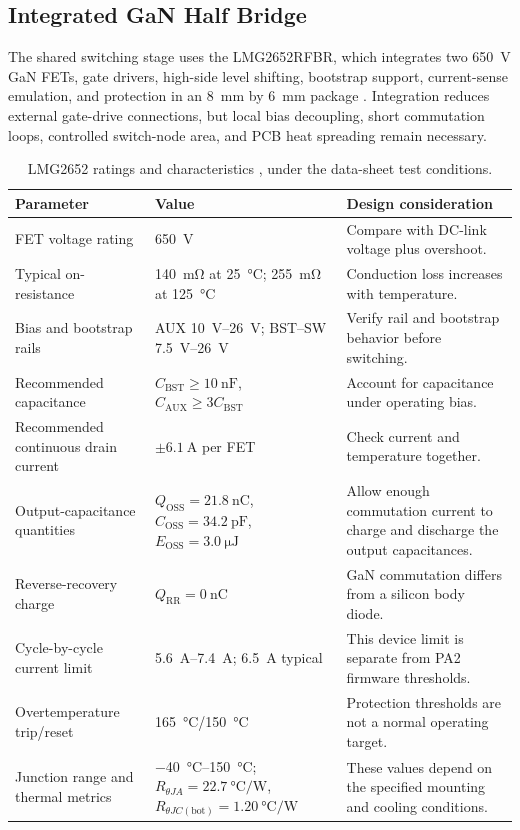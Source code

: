 \subsection{Integrated GaN Half Bridge}
\label{sec:hw-halfbridge}

The shared switching stage uses the LMG2652RFBR, which integrates two \SI{650}{\volt} GaN FETs, gate drivers, high-side level shifting, bootstrap support, current-sense emulation, and protection in an \SI{8}{\milli\metre} by \SI{6}{\milli\metre} package \cite{tiLMG2652}. Integration reduces external gate-drive connections, but local bias decoupling, short commutation loops, controlled switch-node area, and PCB heat spreading remain necessary.

\begin{table}[htbp]
\centering
\caption{LMG2652 ratings and characteristics \cite{tiLMG2652}, under the data-sheet test conditions.}
\label{tab:lmg2652-ratings}
\small
\begin{tabularx}{\textwidth}{@{}p{}p{}X@{}}
\toprule
Parameter & Value & Design consideration\\
\midrule
FET voltage rating & \SI{650}{\volt} & Compare with DC-link voltage plus overshoot.\\
Typical on-resistance & \SI{140}{\milli\ohm} at \SI{25}{\celsius}; \SI{255}{\milli\ohm} at \SI{125}{\celsius} & Conduction loss increases with temperature.\\
Bias and bootstrap rails & AUX \SIrange{10}{26}{\volt}; BST--SW \SIrange{7.5}{26}{\volt} & Verify rail and bootstrap behavior before switching.\\
Recommended capacitance & \(C_{\mathrm{BST}}\geq\SI{10}{\nano\farad}\), \(C_{\mathrm{AUX}}\geq3C_{\mathrm{BST}}\) & Account for capacitance under operating bias.\\
Recommended continuous drain current & \(\pm\SI{6.1}{\ampere}\) per FET & Check current and temperature together.\\
Output-capacitance quantities & \(Q_{\mathrm{OSS}}=\SI{21.8}{\nano\coulomb}\), \(C_{\mathrm{OSS}}=\SI{34.2}{\pico\farad}\), \(E_{\mathrm{OSS}}=\SI{3.0}{\micro\joule}\) & Allow enough commutation current to charge and discharge the output capacitances.\\
Reverse-recovery charge & \(Q_{\mathrm{RR}}=\SI{0}{\nano\coulomb}\) & GaN commutation differs from a silicon body diode.\\
Cycle-by-cycle current limit & \SIrange{5.6}{7.4}{\ampere}; \SI{6.5}{\ampere} typical & This device limit is separate from PA2 firmware thresholds.\\
Overtemperature trip/reset & \SI{165}{\celsius}/\SI{150}{\celsius} & Protection thresholds are not a normal operating target.\\
Junction range and thermal metrics & \SIrange{-40}{150}{\celsius}; \(R_{\theta JA}=\SI{22.7}{\celsius\per\watt}\), \(R_{\theta JC(\mathrm{bot})}=\SI{1.20}{\celsius\per\watt}\) & These values depend on the specified mounting and cooling conditions.\\
\bottomrule
\end{tabularx}
\end{table}


